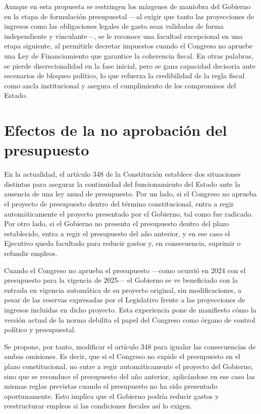 

Aunque  en esta propuesta se restringen los márgenes de maniobra del Gobierno en la etapa de formulación presupuestal —al exigir que tanto las proyecciones de ingresos como las obligaciones legales de gasto sean validadas de forma independiente y vinculante—, se le reconoce una facultad excepcional en una etapa siguiente, al permitirle decretar impuestos cuando el Congreso no apruebe una Ley de Financiamiento que garantice la coherencia fiscal. En otras palabras, se pierde discrecionalidad en la fase inicial, pero se gana capacidad decisoria ante escenarios de bloqueo político, lo que refuerza la credibilidad de la regla fiscal como ancla institucional y asegura el cumplimiento de los compromisos del Estado.

\section{Efectos de la no aprobación del presupuesto}

En la actualidad, el artículo 348 de la Constitución establece dos situaciones distintas para asegurar la continuidad del funcionamiento del Estado ante la ausencia de una ley anual de presupuesto. Por un lado, si el Congreso no aprueba el proyecto de presupuesto dentro del término constitucional, entra a regir automáticamente el proyecto presentado por el Gobierno, tal como fue radicado. Por otro lado, si el Gobierno no presenta el presupuesto dentro del plazo establecido, entra a regir el presupuesto del año anterior, y en ese caso el Ejecutivo queda facultado para reducir gastos y, en consecuencia, suprimir o refundir empleos.

Cuando el Congreso no aprueba el presupuesto —como ocurrió en 2024 con el presupuesto para la vigencia de 2025— el Gobierno se ve beneficiado con la entrada en vigencia automática de su proyecto original, sin modificaciones, a pesar de las reservas expresadas por el Legislativo frente a las proyecciones de ingresos incluidas en dicho proyecto. Esta experiencia pone de manifiesto cómo la versión actual de la norma debilita el papel del Congreso como órgano de control político y presupuestal.

Se propone, por tanto, modificar el artículo 348 para igualar las consecuencias de ambas omisiones. Es decir, que si el Congreso no expide el presupuesto en el plazo constitucional, no entre a regir automáticamente el proyecto del Gobierno, sino que se reconduce el presupuesto del año anterior, aplicándose en ese caso las mismas reglas previstas cuando el presupuesto no ha sido presentado oportunamente. Esto implica que el Gobierno podría reducir gastos y reestructurar empleos si las condiciones fiscales así lo exigen.

